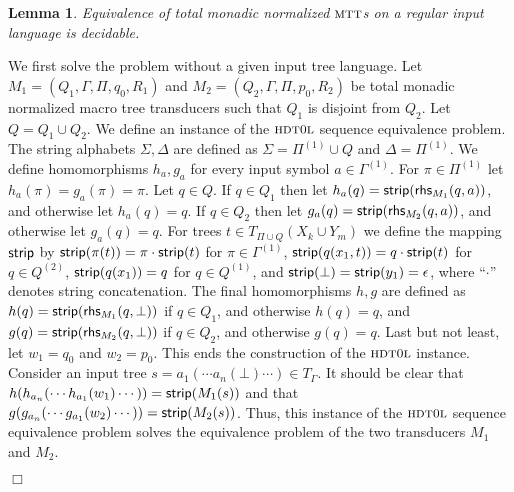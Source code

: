 \documentclass[copyright,creativecommons]{eptcs}
\newtheorem{lemma}{Lemma}
\newcommand{\eop}{\hspace*{\fill}$\Box$}
\newenvironment{proof}{{\it Proof.}\quad}{\eop\vspace*{4mm}}
\newcommand{\mtt}{\textsc{mtt}}
\newcommand{\hdtol}{\textsc{hdt{\small 0}l}}
\def\strip{{\sf strip}}
\def\rhs{{\sf rhs}}
\begin{document}
\begin{lemma}\label{lm:totalmonadic}
Equivalence of total monadic normalized $\mtt$s 
on a regular input language is decidable.
\end{lemma}
\begin{proof}
We first solve the problem without a given input tree language. 
Let $M_1=(Q_1,\Gamma,\Pi,q_0,R_1)$ and $M_2=(Q_2,\Gamma,\Pi,p_0,R_2)$
be total monadic normalized macro tree transducers such 
that $Q_1$ is disjoint from $Q_2$. Let $Q=Q_1\cup Q_2$. 
We define an instance of the $\hdtol$ sequence equivalence problem.
The string alphabets $\Sigma, \Delta$ are defined as $\Sigma=\Pi^{(1)}\cup Q$
and $\Delta=\Pi^{(1)}$.
We define homomorphisms $h_a, g_a$ for every input symbol $a\in\Gamma^{(1)}$.
For $\pi\in\Pi^{(1)}$ let $h_a(\pi)=g_a(\pi)=\pi$.
Let $q\in Q$. 
If $q\in Q_1$ then let $h_a(q)=\strip(\rhs_{M_1}(q,a))$,
and otherwise let $h_a(q)=q$. 
If $q\in Q_2$ then let $g_a(q)=\strip(\rhs_{M_2}(q,a))$,
and otherwise let $g_a(q)=q$. 
For trees $t\in T_{\Pi\cup Q}(X_k\cup Y_m)$ we define the mapping $\strip$ 
by $\strip(\pi(t))=\pi\cdot\strip(t)$ for $\pi\in\Gamma^{(1)}$,
$\strip(q(x_1,t))=q\cdot\strip(t)$ for $q\in Q^{(2)}$, 
$\strip(q(x_1))=q$ for $q\in Q^{(1)}$, and 
$\strip(\bot)=\strip(y_1)=\epsilon$, where ``$\cdot$''
denotes string concatenation.
The final homomorphisms $h, g$ are defined as $h(q)=\strip(\rhs_{M_1}(q,\bot))$
if $q\in Q_1$, and otherwise $h(q)=q$, and
$g(q)=\strip(\rhs_{M_2}(q,\bot))$ if $q\in Q_2$, and otherwise $g(q)=q$.
Last but not least, let $w_1=q_0$ and $w_2=p_0$. This ends the construction of the $\hdtol$ instance.
Consider an input tree $s=a_1(\cdots a_n(\bot)\cdots)\in T_\Gamma$.
It should be clear that 
$h(h_{a_n}(\cdots h_{a_1}(w_1)\cdots))=\strip(M_1(s))$ and that
$g(g_{a_n}(\cdots g_{a_1}(w_2)\cdots))=\strip(M_2(s))$.
Thus, this instance of the $\hdtol$ sequence equivalence problem 
solves the equivalence problem of the two transducers $M_1$ and $M_2$.


\end{proof}
\end{document}
